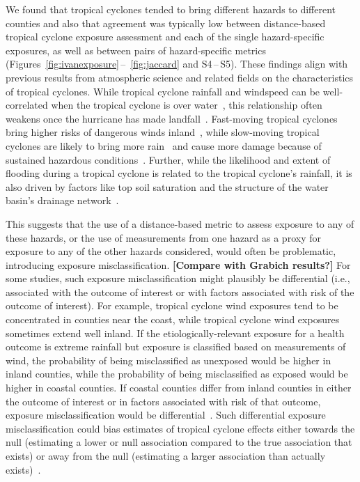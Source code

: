 We found that tropical cyclones tended to bring different hazards to different
counties and also that agreement was typically low between distance-based
tropical cyclone exposure assessment and each of the single hazard-specific
exposures, as well as between pairs of hazard-specific metrics
(Figures~\ref{fig:ivanexposure}\,--\, \ref{fig:jaccard} and S4\,--\,S5).  These
findings align with previous results from atmospheric science and related
fields on the characteristics of tropical cyclones. While tropical cyclone
rainfall and windspeed can be well-correlated when the tropical cyclone is over
water~\parencite{cerveny2000}, this relationship often weakens once the
hurricane has made landfall~\parencite{jiang2008}.  Fast-moving tropical
cyclones bring higher risks of dangerous winds inland~\parencite{kruk2010},
while slow-moving tropical cyclones are likely to bring more
rain~\parencite{rappaport2000} and cause more damage because of sustained
hazardous conditions~\parencite{rezapour2014}. Further, while the likelihood
and extent of flooding during a tropical cyclone is related to the tropical
cyclone's rainfall, it is also driven by factors like top soil saturation and
the structure of the water basin's drainage network~\parencite{chen2015,
rees2001}. 

This suggests that the use of a distance-based metric to assess exposure to any
of these hazards, or the use of measurements from one hazard as a proxy for
exposure to any of the other hazards considered, would often be problematic,
introducing exposure misclassification. \textbf{[Compare with Grabich results?]}
For some studies, such exposure misclassification might plausibly be
differential (i.e., associated with the outcome of interest or with factors
associated with risk of the outcome of interest).  For example, tropical
cyclone wind exposures tend to be concentrated in counties near the coast,
while tropical cyclone wind exposures sometimes extend well inland.  If the
etiologically-relevant exposure for a health outcome is extreme rainfall but
exposure is classified based on measurements of wind, the probability of being
misclassified as unexposed would be higher in inland counties, while the
probability of being misclassified as exposed would be higher in coastal
counties. If coastal counties differ from inland counties in either the outcome
of interest or in factors associated with risk of that outcome, exposure
misclassification would be differential~\parencite{savitz2016interpreting}.
Such differential exposure misclassification could bias estimates of tropical
cyclone effects either towards the null (estimating a lower or null association
compared to the true association that exists) or away from the null (estimating
a larger association than actually exists)~\parencite{savitz2016interpreting,
armstrong1998effect}.  

